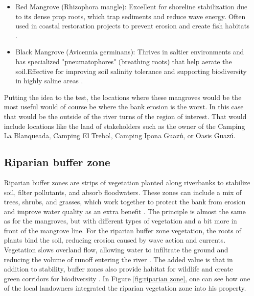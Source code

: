 \begin{itemize}
    \item Red Mangrove (Rhizophora mangle): Excellent for shoreline stabilization due to its dense prop roots, which trap sediments and reduce wave energy. Often used in coastal restoration projects to prevent erosion and create fish habitats \autocite{sprungHowLongDoes2021}.
    \item Black Mangrove (Avicennia germinans): Thrives in saltier environments and has specialized "pneumatophores" (breathing roots) that help aerate the soil.Effective for improving soil salinity tolerance and supporting biodiversity in highly saline areas \autocite{hammondWhatBlackMangrove2022}.
\end{itemize}

Putting the idea to the test, the locations where these mangroves would be the most useful would of course be where the bank erosion is the worst. In this case that would be the outside of the river turns of the region of interest. That would include locations like the land of stakeholders such as the owner of the Camping La Blanqueada, Camping El Trebol, Camping Ipona Guazú, or Oasis Guazú.

\subsection{Riparian buffer zone}
Riparian buffer zones are strips of vegetation planted along riverbanks to stabilize soil, filter pollutants, and absorb floodwaters. These zones can include a mix of trees, shrubs, and grasses, which work together to protect the bank from erosion and improve water quality as an extra benefit \autocite{ukforestrystandardCreatingManagingRiparian2024}. The principle is almost the same as for the mangroves, but with different types of vegetation and a bit more in front of the mangrove line. For the riparian buffer zone vegetation, the roots of plants bind the soil, reducing erosion caused by wave action and currents. Vegetation slows overland flow, allowing water to infiltrate the ground and reducing the volume of runoff entering the river \autocite{marshallUnderstandingVitalRole2024}. The added value is that in addition to stability, buffer zones also provide habitat for wildlife and create green corridors for biodiversity \autocite{vagheeiFreshwaterRiparianZones2025}. In Figure \ref{fig:riparian zone}, one can see how one of the local landowners integrated the riparian vegetation zone into his property.

